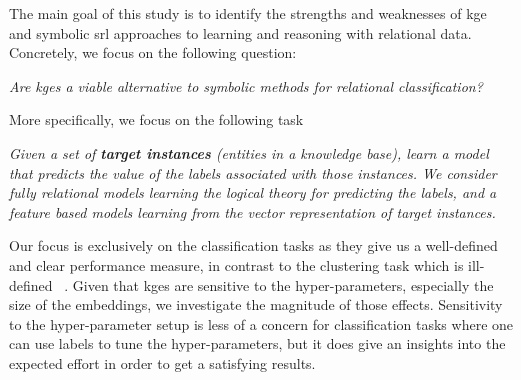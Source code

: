 The main goal of this study is to identify the strengths and weaknesses of  \gls{kge} and symbolic \gls{srl} approaches to learning and reasoning with relational data.
Concretely, we focus on the following question:

\begin{displayquote}
\textit{Are \gls{kge}s a viable alternative to symbolic methods for relational classification?}
\end{displayquote}


\noindent More specifically, we focus on the following task

\begin{displayquote}
\textit{Given a set of \textbf{target instances} (entities in a knowledge base), learn a model that predicts the value of the labels associated with those instances. We consider fully relational models learning the logical theory for predicting the labels, and a feature based models learning from the vector representation of target instances.}
\end{displayquote}


Our focus is exclusively on the classification tasks as they give us a well-defined and clear performance measure, in contrast to the clustering task which is ill-defined ~\cite{Estivill-Castro:2002}.
Given that \gls{kge}s are sensitive to the hyper-parameters, especially the size of the embeddings, we investigate the magnitude of those effects.
Sensitivity to the hyper-parameter setup is less of a concern for classification tasks where one can use labels to tune the hyper-parameters, but it does give an insights into the expected effort in order to get a satisfying results.





